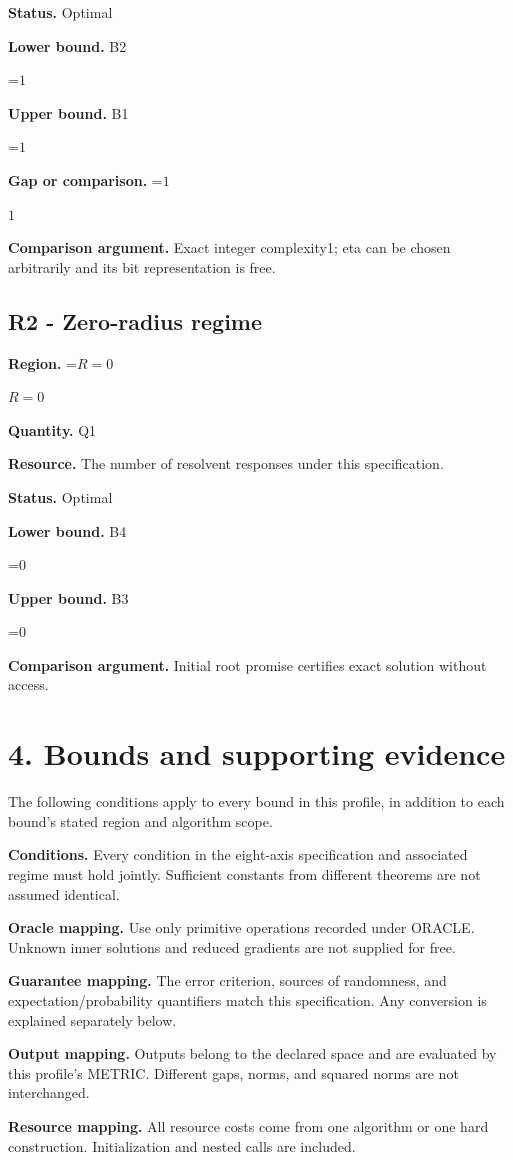 \documentclass[10pt,a4paper]{article}
\newcommand{\AtlasMath}[1]{\par\begingroup\centering\setbox0=\hbox{$\displaystyle #1$}\ifdim\wd0>1.4\linewidth\typeout{ATLAS WIDE FORMULA: \the\wd0}\fi\ifdim\wd0>\linewidth\resizebox{\linewidth}{!}{\box0}\else\box0\fi\par\endgroup}
\newcommand{\AtlasInlineMath}[1]{\begingroup\setbox0=\hbox{$#1$}\ifdim\wd0>.4\linewidth\endgroup\AtlasMath{#1}\else\endgroup$#1$\fi}
\begin{document}
\textbf{Status.} Optimal

\textbf{Lower bound.} B2

\AtlasMath{1}
\textbf{Upper bound.} B1

\AtlasMath{1}
\textbf{Gap or comparison.} \AtlasInlineMath{1}

\textbf{Comparison argument.} Exact integer complexity1; eta can be chosen arbitrarily and its bit representation is free.

\subsection{R2 - Zero-radius regime}
\textbf{Region.} \AtlasInlineMath{R=0}

\textbf{Quantity.} Q1

\textbf{Resource.} The number of resolvent responses under this specification.

\textbf{Status.} Optimal

\textbf{Lower bound.} B4

\AtlasMath{0}
\textbf{Upper bound.} B3

\AtlasMath{0}
\textbf{Comparison argument.} Initial root promise certifies exact solution without access.

\section{4. Bounds and supporting evidence}
The following conditions apply to every bound in this profile, in addition to each bound's stated region and algorithm scope.

\textbf{Conditions.} Every condition in the eight-axis specification and associated regime must hold jointly. Sufficient constants from different theorems are not assumed identical.

\textbf{Oracle mapping.} Use only primitive operations recorded under ORACLE. Unknown inner solutions and reduced gradients are not supplied for free.

\textbf{Guarantee mapping.} The error criterion, sources of randomness, and expectation/probability quantifiers match this specification. Any conversion is explained separately below.

\textbf{Output mapping.} Outputs belong to the declared space and are evaluated by this profile's METRIC. Different gaps, norms, and squared norms are not interchanged.

\textbf{Resource mapping.} All resource costs come from one algorithm or one hard construction. Initialization and nested calls are included.
\end{document}
